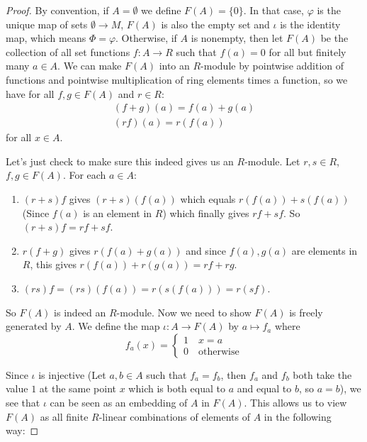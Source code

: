 \documentclass[11pt]{article}
\theoremstyle{definition}
\theoremstyle{plain}
\theoremstyle{plain}
\theoremstyle{plain}
\theoremstyle{definition}
\begin{document}
\begin{proof}
By convention, if $A = \emptyset$ we define $F(A) = \{0\}$. In that case, $\varphi$ is the unique map of sets $\emptyset \to M$, $F(A)$ is also the empty set and $\iota$ is the identity map, which means $\Phi = \varphi$. Otherwise, if $A$ is nonempty, then let $F(A)$ be the collection of all set functions $f: A \to R$ such that $f(a) = 0$ for all but finitely many $a \in A$. We can make $F(A)$ into an $R$-module by pointwise addition of functions and pointwise multiplication of ring elements times a function, so we have for all $f, g \in F(A)$ and $r \in R$:
\begin{equation*}
\begin{array}{cc}
(f +g)(a) = f(a) + g(a) \\
(rf)(a) = r(f(a))
\end{array}
\end{equation*}
for all $x \in A$.

Let's just check to make sure this indeed gives us an $R$-module. Let $r,s \in R$, $f, g \in F(A)$. For each $a \in A$:
\begin{enumerate}
\item $(r+s)f$ gives $(r+s)(f(a))$ which equals $r(f(a)) + s(f(a))$ (Since $f(a)$ is an element in $R$) which finally gives $rf + sf$. So $(r+s)f=rf + sf$.
\item $r(f+g)$ gives $r(f(a)+g(a))$ and since $f(a), g(a)$ are elements in $R$, this gives $r(f(a)) + r(g(a)) = rf + rg$.
\item $(rs)f = (rs)(f(a)) = r(s(f(a))) = r(sf)$.
\end{enumerate}

So $F(A)$ is indeed an $R$-module. Now we need to show $F(A)$ is freely generated by $A$. We define the map $\iota: A \to F(A)$ by $a \mapsto f_a$ where
\begin{equation*}
f_a(x) = \left\{
\begin{array}{lr}
1 \quad x = a \\
0 \quad \text{otherwise}
\end{array}
\right.
\end{equation*}

Since $\iota$ is injective (Let $a,b \in A$ such that $f_a = f_b$, then $f_a$ and $f_b$ both take the value $1$ at the same point $x$ which is both equal to $a$ and equal to $b$, so $a=b$), we see that $\iota$ can be seen as an embedding of $A$ in $F(A)$. This allows us to view $F(A)$ as all finite $R$-linear combinations of elements of $A$ in the following way:


\end{proof}
\end{document}
